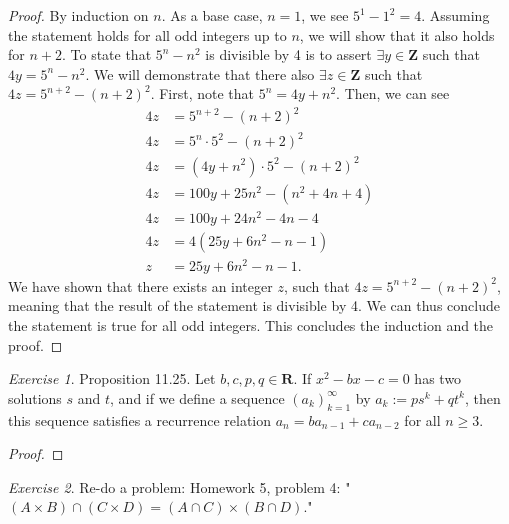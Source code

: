 \documentclass[12pt,oneside]{amsart}
\theoremstyle{remark}
\newtheorem{exer}{Exercise}
\newcommand{\bfZ}{\mathbf{Z}}
\newcommand{\bfR}{\mathbf{R}}
\begin{document}
\begin{proof}
By induction on $n$. As a base case, $n = 1$, we see $5^1 - 1^2 = 4$. Assuming the statement holds for all odd integers up to $n$, we will show that it also holds for $n + 2$. To state that $5^n - n^2$ is divisible by 4 is to assert $\exists y \in \bfZ$ such that $4y = 5^n - n^2$. We will demonstrate that there also $\exists z \in \bfZ$ such that $4z = 5^{n + 2} - (n + 2)^2$. First, note that $5^n = 4y + n^2$. Then, we can see
\begin{align*}
4z &= 5^{n + 2} - (n + 2)^2 \\
4z &= 5^n \cdot 5^2 - (n + 2)^2 \\
4z &= (4y + n^2) \cdot 5^2 - (n + 2)^2 \tag{by hypothesis} \\
4z &= 100y + 25n^2 - (n^2 + 4n + 4) \tag{distributing and expanding} \\
4z &= 100y + 24n^2 - 4n - 4 \tag{simplifying} \\
4z &= 4(25y + 6n^2 - n - 1) \\
 z &= 25y + 6n^2 - n - 1.
\end{align*}
We have shown that there exists an integer $z$, such that $4z = 5^{n + 2} - (n + 2)^2$, meaning that the result of the statement is divisible by 4. We can thus conclude the statement is true for all odd integers. This concludes the induction and the proof.
\end{proof}

\newpage
\begin{exer}
Proposition 11.25. Let $b, c, p, q \in \bfR$. If $x^2 - bx - c = 0$ has two solutions $s$ and $t$, and if we define a sequence $(a_k)_{k = 1}^\infty$ by $a_k := ps^k + qt^k$, then this sequence satisfies a recurrence relation $a_n = ba_{n - 1} + ca_{n - 2}$ for all $n \geq 3$.
\end{exer}


\begin{proof}
\end{proof}

\newpage
\begin{exer}
Re-do a problem: Homework 5, problem 4: "$(A \times B) \cap (C \times D) = (A \cap C) \times (B \cap D).$"
\end{exer}
\end{document}

